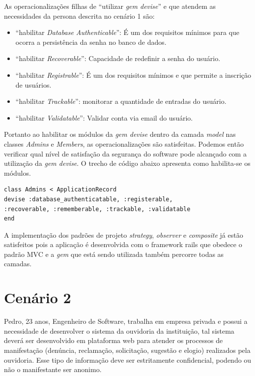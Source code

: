 As operacionalizações filhas de “utilizar \textit{gem devise}” e que atendem as necessidades da persona descrita no cenário 1 são:

\begin{itemize}
	\item “habilitar \textit{Database Authenticable}”: É um dos requisitos mínimos para que ocorra a persistência da senha no banco de dados.
	\item “habilitar \textit{Recoverable}”: Capacidade de redefinir a senha do usuário.
	\item “habilitar \textit{Registrable}”: É um dos requisitos mínimos e que permite a inscrição de usuários. 
	\item “habilitar \textit{Trackable}”: monitorar a quantidade de entradas do usuário. 
	\item “habilitar \textit{Validatable}”: Validar conta via email do usuário. 
\end{itemize}

Portanto ao habilitar os módulos da \textit{gem devise} dentro da camada \textit{model} nas classes \textit{Admins} e \textit{Members}, as operacionalizações são satisfeitas. Podemos então verificar qual nível de satisfação da segurança do software pode alcançado com a utilização da \textit{gem devise}. O trecho de código abaixo apresenta como habilita-se os módulos.  
 

\begin{lstlisting} 
class Admins < ApplicationRecord
devise :database_authenticatable, :registerable,
:recoverable, :rememberable, :trackable, :validatable
end 
\end{lstlisting} 

A implementação dos padrões de projeto \textit{strategy}, \textit{observer} e \textit{composite} já estão satisfeitos pois a aplicação é desenvolvida com o framework rails que obedece o padrão MVC e a \textit{gem} que está sendo utilizada também percorre todas as camadas. 

\section{Cenário 2}
\label{subsec:persona2}

Pedro, 23 anos, Engenheiro de Software, trabalha em empresa privada e possui a necessidade de desenvolver o sistema da ouvidoria da instituição, tal sistema deverá ser desenvolvido em plataforma web para atender os processos de manifestação (denúncia, reclamação, solicitação, sugestão e elogio) realizados pela ouvidoria. Esse tipo de informação deve ser estritamente confidencial, podendo ou não o manifestante ser anonimo.  

